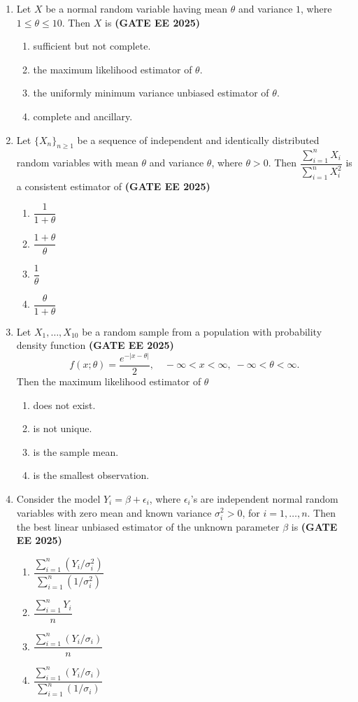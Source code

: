 \documentclass[journal,12pt,onecolumn]{IEEEtran}
\theoremstyle{remark}
\begin{document}
\begin{enumerate}
\item Let $X$ be a normal random variable having mean $\theta$ and variance $1$, where $1 \leq \theta \leq 10$. Then $X$ is \hfill \textbf{(GATE EE 2025)}\\
\begin{enumerate}
    \item sufficient but not complete.
    \item the maximum likelihood estimator of $\theta$.
    \item the uniformly minimum variance unbiased estimator of $\theta$.
    \item complete and ancillary.
\end{enumerate}

\item  Let $\{X_n\}_{n \geq 1}$ be a sequence of independent and identically distributed random variables with mean $\theta$ and variance $\theta$, where $\theta > 0$. Then $\dfrac{\sum_{i=1}^n X_i}{\sum_{i=1}^n X_i^2}$ is a consistent estimator of  \hfill \textbf{(GATE EE 2025)}\\
\begin{enumerate}
    \item $\dfrac{1}{1+\theta}$
    \item $\dfrac{1+\theta}{\theta}$
    \item $\dfrac{1}{\theta}$
    \item $\dfrac{\theta}{1+\theta}$
\end{enumerate}

\item Let $X_1, \ldots, X_{10}$ be a random sample from a population with probability density function \hfill \textbf{(GATE EE 2025)}\\
\[
f(x; \theta) = \frac{e^{-|x-\theta|}}{2}, \quad -\infty < x < \infty, \; -\infty < \theta < \infty.
\]
Then the maximum likelihood estimator of $\theta$
\begin{enumerate}
    \item does not exist.
    \item is not unique.
    \item is the sample mean.
    \item is the smallest observation.
\end{enumerate}

\item Consider the model $Y_i = \beta + \epsilon_i$, where $\epsilon_i$'s are independent normal random variables with zero mean and known variance $\sigma_i^2 > 0$, for $i=1, \ldots, n$. Then the best linear unbiased estimator of the unknown parameter $\beta$ is  \hfill \textbf{(GATE EE 2025)}\\
\begin{enumerate}
    \item $\dfrac{\sum_{i=1}^n (Y_i / \sigma_i^2)}{\sum_{i=1}^n (1/\sigma_i^2)}$
    \item $\dfrac{\sum_{i=1}^n Y_i}{n}$
    \item $\dfrac{\sum_{i=1}^n (Y_i / \sigma_i)}{n}$
    \item $\dfrac{\sum_{i=1}^n (Y_i / \sigma_i)}{\sum_{i=1}^n (1/\sigma_i)}$
\end{enumerate}


\end{enumerate}
\end{document}
